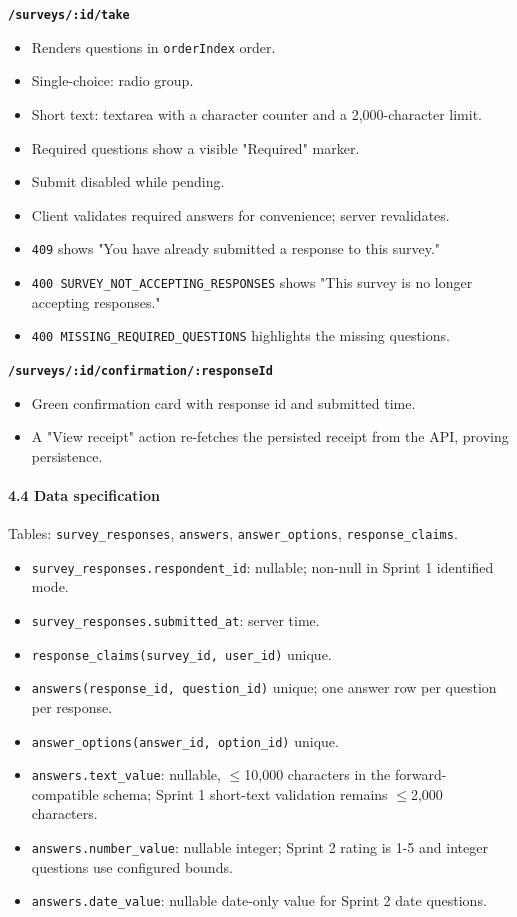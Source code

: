 \documentclass[12pt,a4paper]{article}
\begin{document}
\textbf{\texttt{/surveys/:id/take}}

\begin{itemize}[leftmargin=*]
\item Renders questions in \texttt{orderIndex} order.
\item Single-choice: radio group.
\item Short text: textarea with a character counter and a 2,000-character limit.
\item Required questions show a visible "Required" marker.
\item Submit disabled while pending.
\item Client validates required answers for convenience; server revalidates.
\item \texttt{409} shows "You have already submitted a response to this survey."
\item \texttt{400 SURVEY\_NOT\_ACCEPTING\_RESPONSES} shows "This survey is no longer accepting responses."
\item \texttt{400 MISSING\_REQUIRED\_QUESTIONS} highlights the missing questions.
\end{itemize}

\textbf{\texttt{/surveys/:id/confirmation/:responseId}}

\begin{itemize}[leftmargin=*]
\item Green confirmation card with response id and submitted time.
\item A "View receipt" action re-fetches the persisted receipt from the API, proving persistence.
\end{itemize}

\paragraph*{4.4 Data specification}
Tables: \texttt{survey\_responses}, \texttt{answers}, \texttt{answer\_options}, \texttt{response\_claims}.

\begin{itemize}[leftmargin=*]
\item \texttt{survey\_responses.respondent\_id}: nullable; non-null in Sprint 1 identified mode.
\item \texttt{survey\_responses.submitted\_at}: server time.
\item \texttt{response\_claims(survey\_id, user\_id)} unique.
\item \texttt{answers(response\_id, question\_id)} unique; one answer row per question per response.
\item \texttt{answer\_options(answer\_id, option\_id)} unique.
\item \texttt{answers.text\_value}: nullable, $\leq$10,000 characters in the forward-compatible schema; Sprint 1 short-text validation remains $\leq$2,000 characters.
\item \texttt{answers.number\_value}: nullable integer; Sprint 2 rating is 1-5 and integer questions use configured bounds.
\item \texttt{answers.date\_value}: nullable date-only value for Sprint 2 date questions.
\end{itemize}
\end{document}
